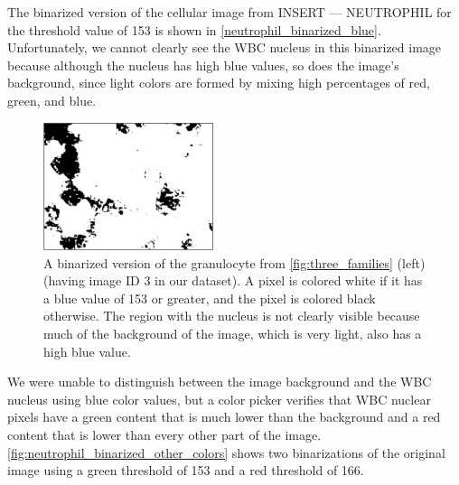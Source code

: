 The binarized version of the cellular image from INSERT --- NEUTROPHIL for the threshold value of 153 is shown in \autoref{neutrophil_binarized_blue}. Unfortunately, we cannot clearly see the WBC nucleus in this binarized image because although the nucleus has high blue values, so does the image's background, since light colors are formed by mixing high percentages of red, green, and blue.

\begin{figure}[p]
\centering
\mySfFamily
\includegraphics[width = 0.444\textwidth]{../images/neutrophil_binarized_blue.png}
\caption{A binarized version of the granulocyte from \autoref{fig:three_families} (left) (having image ID 3 in our dataset). A pixel is colored white if it has a blue value of 153 or greater, and the pixel is colored black otherwise. The region with the nucleus is not clearly visible because much of the background of the image, which is very light, also has a high blue value.}
\label{fig:neutrophil_binarized_blue}
\end{figure}

\begin{qbox}\end{qbox}

We were unable to distinguish between the image background and the WBC nucleus using blue color values, but a color picker verifies that WBC nuclear pixels have a green content that is much lower than the background and a red content that is lower than every other part of the image. \autoref{fig:neutrophil_binarized_other_colors} shows two binarizations of the original image using a green threshold of 153 and a red threshold of 166.

